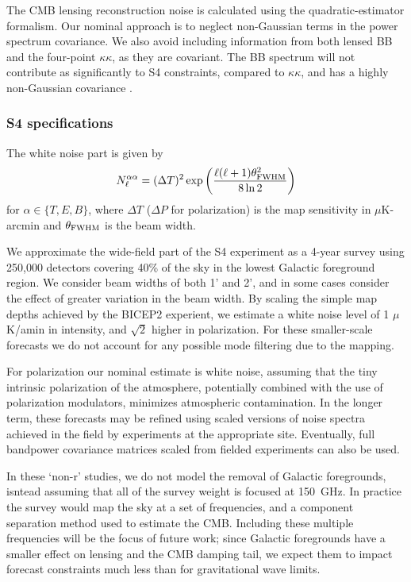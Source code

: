 The CMB lensing reconstruction noise is calculated using the \cite{Hu:2001kj} quadratic-estimator formalism. Our nominal approach is to neglect non-Gaussian terms in the power spectrum covariance. We also avoid including information from both lensed BB and the four-point $\kappa \kappa$, as they are covariant. The BB spectrum will not contribute as significantly to S4 constraints, compared to $\kappa \kappa$, and has a highly non-Gaussian covariance \cite{BenoitLevy:2012va}. 

\subsubsection{S4 specifications}
The white noise part is given by
%
\begin{equation}
N^{\alpha \alpha}_\ell = (\Delta T)^2 \exp \left( \frac{\ell(\ell + 1) \theta^2_{\rm FWHM}}{8 \ln 2} \right)
\end{equation}
%
for $\alpha \in \{T, E, B\}$, where $\Delta T$ ($\Delta P$ for polarization) is the map sensitivity in $\mu$K-arcmin and $\theta_{\rm FWHM}$ is the beam width. 

We approximate the wide-field part of the S4 experiment as a 4-year survey using 250,000 detectors covering 40\% of the sky in the lowest Galactic foreground region. We consider beam widths of both 1' and 2', and in some cases consider the effect of greater variation in the beam width. By scaling the simple map depths achieved by the BICEP2 experient, we estimate a white noise level of 1 $\mu$K/amin in intensity, and $\sqrt{2}$ higher in polarization. For these smaller-scale forecasts we do not account for any possible mode filtering due to the mapping.

For polarization our nominal estimate is white noise, assuming that the tiny intrinsic polarization of the atmosphere, potentially combined with the use of polarization modulators, minimizes atmospheric contamination. In the longer term, these forecasts may be refined using scaled versions of noise spectra achieved in the field by experiments at the appropriate site. Eventually, full bandpower covariance matrices scaled from fielded experiments can also be used.

In these `non-r' studies, we do not model the removal of Galactic foregrounds, isntead assuming that all of the survey weight is focused at 150~GHz. In practice the survey would map the sky at a set of frequencies, and a component separation method used to estimate the CMB. Including these multiple frequencies will be the focus of future work; since Galactic foregrounds have a smaller effect on lensing and the CMB damping tail, we expect them to impact forecast constraints much less than for gravitational wave limits.

